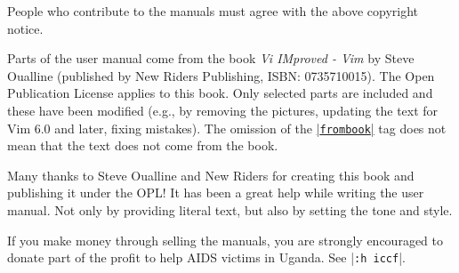 People who contribute to the manuals must agree with the above copyright notice.

\label{frombook}
Parts of the user manual come from the book \textit{Vi IMproved - Vim} by Steve Oualline (published by New Riders Publishing, ISBN: 0735710015).
The Open Publication License applies to this book.
Only selected parts are included and these have been modified (e.g., by removing the pictures, updating the text for Vim 6.0 and later, fixing mistakes).
The omission of the \hyperref[frombook]{|\texttt{frombook}|} tag does not mean that the text does not come from the book.

Many thanks to Steve Oualline and New Riders for creating this book and publishing it under the OPL!
It has been a great help while writing the user manual.
Not only by providing literal text, but also by setting the tone and style.

If you make money through selling the manuals, you are strongly encouraged to donate part of the profit to help AIDS victims in Uganda.
See |\verb!:h iccf!|.
\clearpage
